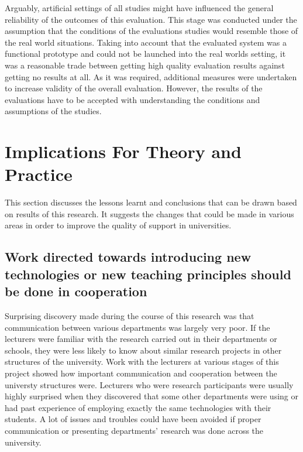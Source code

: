 Arguably, artificial settings of all studies might have influenced the general
reliability of the outcomes of this evaluation. This stage was conducted
under the assumption that the conditions of the evaluations studies would
resemble those of the real world situations. Taking into account that the
evaluated system was a functional prototype and could not be launched into the
real worlds setting, it was a reasonable trade between getting high quality
evaluation results against getting no results at all. As it was required,
additional measures were undertaken to increase validity of the overall
evaluation. However, the results of the evaluations have to be accepted with
understanding the conditions and assumptions of the studies.

\section{Implications For Theory and Practice}

This section discusses the lessons learnt and conclusions that can be drawn
based on results of this research. It suggests the changes that could be made in
various areas in order to improve the quality of \LLLs support in universities.

\subsection[Cooperation and Communication]{Work directed towards introducing
new technologies or new teaching principles should be done in cooperation}

Surprising discovery made during the course of this research was that
communication between various departments was largely very poor. If the
lecturers were familiar with the research carried out in their departments or
schools, they were less likely to know about similar research projects in other
structures of the university. Work with the lecturers at various stages of this
project showed how important communication and cooperation between the universty
structures were. Lecturers who were research participants were usually highly
surprised when they discovered that some other departments were using or had
past experience of employing exactly the same technologies with their students.
A lot of issues and troubles could have been avoided if proper communication or
presenting departments' research was done across the university.

